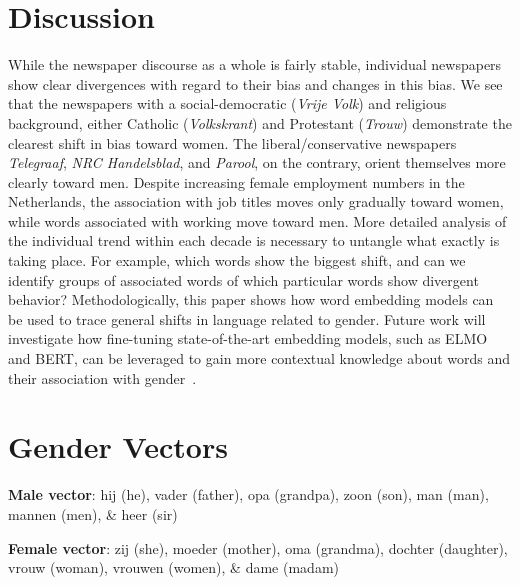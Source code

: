 \documentclass[11pt,a4paper]{article}
\begin{document}
\section{Discussion}
While the newspaper discourse as a whole is fairly stable, individual newspapers show clear divergences with regard to their bias and changes in this bias. We see that the newspapers with a social-democratic (\textit{Vrije Volk}) and religious background, either Catholic (\textit{Volkskrant}) and Protestant (\textit{Trouw}) demonstrate the clearest shift in bias toward women. The liberal/conservative newspapers \textit{Telegraaf}, \textit{NRC Handelsblad}, and \textit{Parool}, on the contrary, orient themselves more clearly toward men. 
Despite increasing female employment numbers in the Netherlands, the association with job titles moves only gradually toward women, while words associated with working move toward men. 
More detailed analysis of the individual trend within each decade is necessary to untangle what exactly is taking place. For example, which words show the biggest shift, and can we identify groups of associated words of which particular words show divergent behavior?
Methodologically, this paper shows how word embedding models can be used to trace general shifts in language related to gender. Future work will investigate how fine-tuning state-of-the-art embedding models, such as ELMO and BERT, can be leveraged to gain more contextual knowledge about words and their association with gender~\cite{peters_deep_2018}. 


%



\newpage
\appendix
\section{Gender Vectors}
\textbf{Male vector}: hij (he), vader (father), opa (grandpa), zoon (son), man (man), mannen (men), \& heer (sir)

\textbf{Female vector}: zij (she), moeder (mother), oma (grandma), dochter (daughter), vrouw (woman), vrouwen (women), \& dame (madam)
\end{document}
